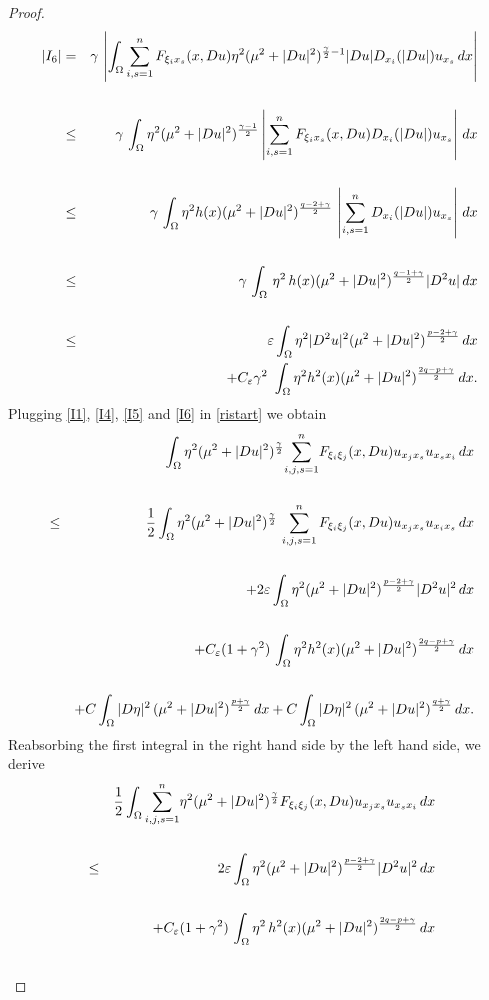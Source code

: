 \documentclass[12pt]{amsart}
\theoremstyle{definition}
\def\tcb{\textcolor{blue}} %
\numberwithin{equation}{section}
\numberwithin{equation}{section}
\begin{document}
{\begin{proof}
\begin{eqnarray}\label{I6}
|{I}_6| &=&   \gamma \, \left |\int_{\Omega} \sum_{i,s=1}^n F_{\xi_i x_s}(x, Du) \eta^2  ({\mu^2} + |Du|^2)^{\frac{\gamma}{2}-1}  |Du| D_{x_i}(|Du|) u_{x_s} \, dx \right |\cr\cr
&\le&  \, \gamma \, \int_{\Omega} \eta^2 ({\mu^2}+|Du|^2)^{\frac{\gamma-1}{2}}  \left |\sum_{i,s=1}^n F_{\xi_i x_s}(x, Du)  D_{x_i}(|Du|) u_{x_s} \right |\, dx  \cr\cr
&\le&  \, \gamma \, \int_{\Omega} \eta^2  h(x)({\mu^2} + |Du|^2)^{\frac{{q-2+\gamma}}{2}}\, \left | \sum_{i,s=1}^n D_{x_i}(|Du|) u_{x_s} \right | \, dx\cr\cr
&\le&  \, \gamma \, \int_{\Omega} \, \eta^2 \, h(x)({\mu^2} + |Du|^2)^{\frac{{q-1+\gamma}}{2}} |D^2 u| \, dx\cr\cr
&\le& \varepsilon \int_{\Omega} \eta^2 |D^2u|^2 ({\mu^2} + |Du|^2)^{\frac{p-2+\gamma}{2}}   \, dx\\\nonumber
&&+ C_\varepsilon \gamma^2 \,  \, \int_{\Omega} \eta^2  h^2(x)({\mu^2} + |Du|^2)^{\frac{{2q - p+\gamma}}{2} }  \, dx.
\end{eqnarray}
Plugging  \eqref{I1}, \eqref{I4}, \eqref{I5} and \eqref{I6} in \eqref{ristart} we obtain
\begin{eqnarray*}
&& \int_{\Omega} \eta^2 ({\mu^2} +|Du|^2)^{\frac{\gamma}{2}}{\sum_{i,j,s=1}^n} F_{\xi_i \xi_j}(x, Du) u_{x_j x_s}  u_{x_s x_i} \, dx\cr\cr
&\le&  \frac{1}{2} \int_{\Omega} \eta^2  ({\mu^2} + |Du|^2)^{\frac{\gamma}{2}}  \, \sum_{i,j,s =1}^n F_{\xi_i \xi_j}(x, Du) u_{x_j x_s} u_{x_i x_s} \, dx\cr\cr
&&+2\varepsilon \int_{\Omega} \eta^2 ({\mu^2} + |Du|^2)^{\frac{p-2+\gamma}{2}}  |D^2 u|^2 \, dx \cr\cr
&&+ C_\varepsilon (1+\gamma^2)  \, \int_{\Omega} \eta^2  h^2(x)({\mu^2} + |Du|^2)^{\frac{{2 q - p +\gamma}}{2} } \, dx\cr\cr
&& + C\,  {\int_{\Omega} |D \eta|^2 \,  {({\mu}^2 + |Du|^2)^{\frac{p + \gamma}{2}}}\, dx+C \int_{\Omega} |D \eta|^2 \,  {({\mu}^2 + |Du|^2)^{\frac{q + \gamma}{2}}}\, dx.}%
\end{eqnarray*}
Reabsorbing the first integral in the right hand side by the left hand side, we derive
\begin{eqnarray*}
&& \frac{1}{2}\int_{\Omega} {\sum_{i,j,s=1}^n} \eta^2 ({\mu^2} +|Du|^2)^{\frac{\gamma}{2}}  F_{\xi_i \xi_j}(x, Du) u_{x_j x_s} u_{x_s x_i} \, dx\cr\cr
 &\le &2\varepsilon \int_{\Omega} \eta^2 ({\mu^2} + |Du|^2)^{\frac{p-2+\gamma}{2}}  |D^2 u|^2 \, dx \cr\cr
&&+ C_\varepsilon (1+\gamma^2) \,  \int_{\Omega} \eta^2 \, {h^2(x)} ({\mu^2} + |Du|^2)^{\frac{{2 q - p +\gamma}}{2}}  \, dx\cr\cr

\end{eqnarray*}
\end{proof}}
\end{document}
